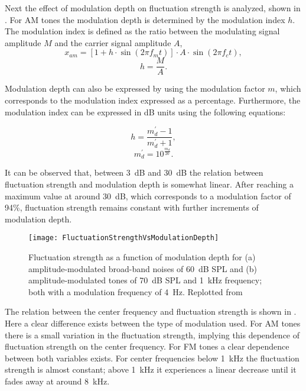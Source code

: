 \documentclass[../main.tex]{subfiles}
\begin{document}
\begin{theoreticalbackground}
Next the effect of modulation depth on fluctuation strength is analyzed, shown
in . For \gls{AM} tones the modulation depth is
determined by the modulation index $h$. The modulation index is defined as the
ratio between the modulating signal amplitude $M$ and the carrier signal
amplitude $A$,
\begin{equation}
  x_{am} = [1+h \cdot \sin(2\pi f_m t)]\cdot A \cdot \sin(2\pi f_c t),
\end{equation}
\begin{equation}
  h=\frac{M}{A}.
\end{equation}

Modulation depth can also be expressed by using the modulation factor $m$,
which corresponds to the modulation index expressed as a percentage.
Furthermore, the modulation index can be expressed in dB units using the
following equations:

\begin{equation}
  h = \frac{m_d^{\prime}-1}{m_d^{\prime}+1},
\end{equation}
\begin{equation}
  m_d^{\prime} = 10^{\frac{m_d}{20}}.
\end{equation}

It can be observed that, between 3~dB and 30~dB
the relation between fluctuation strength and modulation depth is somewhat
linear. After reaching a maximum value at around 30~dB, which corresponds to a
modulation factor of 94\%, fluctuation strength remains constant with further
increments of modulation depth.

\begin{figure}[!ht]
  \centering
  \texttt{[image: FluctuationStrengthVsModulationDepth]}
  \caption{Fluctuation strength as a function of modulation depth for (a)
    amplitude-modulated broad-band noises of 60~dB SPL and (b)
    amplitude-modulated tones of 70~dB SPL and 1~kHz frequency; both with a
    modulation frequency of 4~Hz. Replotted
    from~\cite[pp.~249]{Fastl2007Psychoacoustics}}
\label{fig:flucstrenvsmoddep}
\end{figure}

The relation between the center frequency and fluctuation strength is shown in
. Here a clear difference exists between the type of
modulation used. For \gls{AM} tones there is a small variation in the
fluctuation strength, implying this dependence of fluctuation strength on the
center frequency. For \gls{FM} tones a clear dependence between
both variables exists. For center frequencies below 1~kHz the fluctuation
strength is almost constant; above 1~kHz it experiences a linear decrease until
it fades away at around 8~kHz.


\end{theoreticalbackground}
\end{document}

